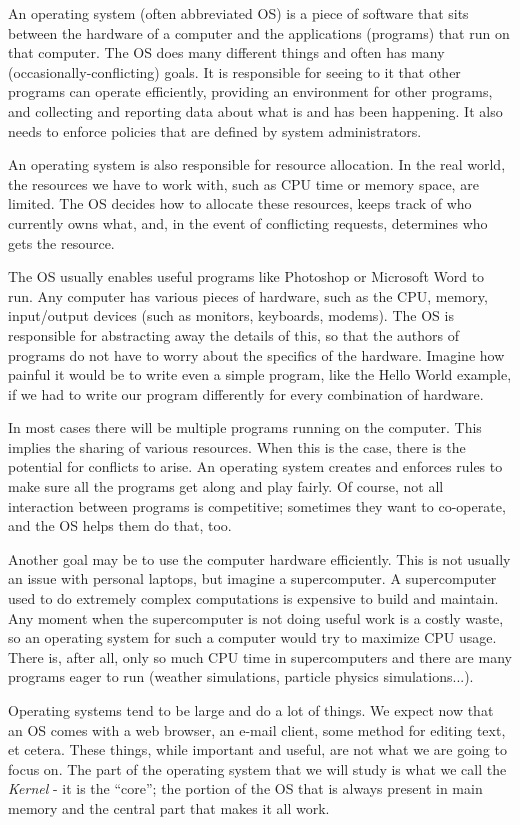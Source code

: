 An operating system (often abbreviated OS) is a piece of software that sits between the hardware of a computer and the applications (programs) that run on that computer. The OS does many different things and often has many (occasionally-conflicting) goals. It is responsible for seeing to it that other programs can operate efficiently, providing an environment for other programs, and collecting and reporting data about what is and has been happening. It also needs to enforce policies that are defined by system administrators.

An operating system is also responsible for resource allocation. In the real world, the resources we have to work with, such as CPU time or memory space, are limited. The OS decides how to allocate these resources, keeps track of who currently owns what, and, in the event of conflicting requests, determines who gets the resource.

The OS usually enables useful programs like Photoshop or Microsoft Word to run. Any computer has various pieces of hardware, such as the CPU, memory, input/output devices (such as monitors, keyboards, modems). The OS is responsible for abstracting away the details of this, so that the authors of programs do not have to worry about the specifics of the hardware. Imagine how painful it would be to write even a simple program, like the Hello World example, if we had to write our program differently for every combination of hardware.

In most cases there will be multiple programs running on the computer. This implies the sharing of various resources. When this is the case, there is the potential for conflicts to arise. An operating system creates and enforces rules to make sure all the programs get along and play fairly. Of course, not all interaction between programs is competitive; sometimes they want to co-operate, and the OS helps them do that, too.

Another goal may be to use the computer hardware efficiently. This is not usually an issue with personal laptops, but imagine a supercomputer. A supercomputer used to do extremely complex computations is expensive to build and maintain. Any moment when the supercomputer is not doing useful work is a costly waste, so an operating system for such a computer would try to maximize CPU usage. There is, after all, only so much CPU time in supercomputers and there are many programs eager to run (weather simulations, particle physics simulations...).

Operating systems tend to be large and do a lot of things. We expect now that an OS comes with a web browser, an e-mail client, some method for editing text, et cetera. These things, while important and useful, are not what we are going to focus on. The part of the operating system that we will study is what we call the \textit{Kernel} - it is the ``core''; the portion of the OS that is always present in main memory and the central part that makes it all work.

